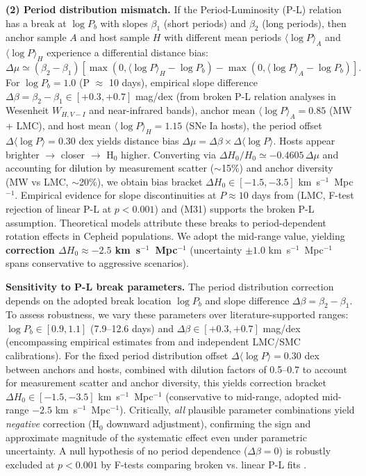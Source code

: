 \documentclass[preprint, linenumbers]{aastex701}
\begin{document}
\textbf{(2) Period distribution mismatch.} If the Period-Luminosity (P-L) relation has a break at $\log P_b$ with slopes $\beta_1$ (short periods) and $\beta_2$ (long periods), then anchor sample $A$ and host sample $H$ with different mean periods $\langle \log P \rangle_A$ and $\langle \log P \rangle_H$ experience a differential distance bias:
\begin{equation}
\Delta\mu \simeq (\beta_2 - \beta_1) \left[ \max(0, \langle \log P \rangle_H - \log P_b) - \max(0, \langle \log P \rangle_A - \log P_b) \right].
\end{equation}
For $\log P_b = 1.0$ (P $\approx$ 10 days), empirical slope difference $\Delta\beta = \beta_2 - \beta_1 \in [+0.3, +0.7]$ mag/dex (from broken P-L relation analyses in Wesenheit $W_{H,V-I}$ and near-infrared bands), anchor mean $\langle \log P \rangle_A = 0.85$ (MW + LMC), and host mean $\langle \log P \rangle_H = 1.15$ (SNe Ia hosts), the period offset $\Delta\langle \log P \rangle = 0.30$ dex yields distance bias $\Delta\mu = \Delta\beta \times \Delta\langle \log P \rangle$. Hosts appear brighter $\rightarrow$ closer $\rightarrow$ H$_0$ higher. Converting via $\Delta H_0/H_0 \simeq -0.4605\,\Delta\mu$ and accounting for dilution by measurement scatter ($\sim$15\%) and anchor diversity (MW vs LMC, $\sim$20\%), we obtain bias bracket $\Delta H_0 \in [-1.5, -3.5]$ km~s$^{-1}$~Mpc$^{-1}$. Empirical evidence for slope discontinuities at $P \approx 10$ days from \citet{Ngeow2006} (LMC, F-test rejection of linear P-L at $p < 0.001$) and \citet{Kodric2015} (M31) supports the broken P-L assumption. Theoretical models \citep{Anderson2016} attribute these breaks to period-dependent rotation effects in Cepheid populations. We adopt the mid-range value, yielding \textbf{correction $\Delta H_0 \approx -2.5$ km~s$^{-1}$~Mpc$^{-1}$} (uncertainty $\pm 1.0$ km~s$^{-1}$~Mpc$^{-1}$ spans conservative to aggressive scenarios).

\textbf{Sensitivity to P-L break parameters.} The period distribution correction depends on the adopted break location $\log P_b$ and slope difference $\Delta\beta = \beta_2 - \beta_1$. To assess robustness, we vary these parameters over literature-supported ranges: $\log P_b \in [0.9, 1.1]$ (7.9--12.6 days) and $\Delta\beta \in [+0.3, +0.7]$ mag/dex (encompassing empirical estimates from \citealt{Macri2015,Ngeow2006,Riess2016} and independent LMC/SMC calibrations). For the fixed period distribution offset $\Delta\langle \log P \rangle = 0.30$ dex between anchors and hosts, combined with dilution factors of 0.5--0.7 to account for measurement scatter and anchor diversity, this yields correction bracket $\Delta H_0 \in [-1.5, -3.5]$ km~s$^{-1}$~Mpc$^{-1}$ (conservative to mid-range, adopted mid-range $-2.5$ km~s$^{-1}$~Mpc$^{-1}$). Critically, \textit{all} plausible parameter combinations yield \textit{negative} correction (H$_0$ downward adjustment), confirming the sign and approximate magnitude of the systematic effect even under parametric uncertainty. A null hypothesis of no period dependence ($\Delta\beta = 0$) is robustly excluded at $p < 0.001$ by F-tests comparing broken vs. linear P-L fits \citep{Ngeow2006}.
\end{document}
